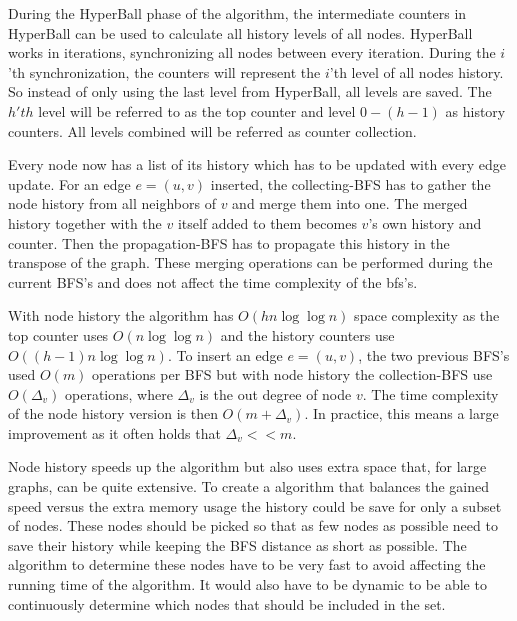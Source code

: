 During the HyperBall phase of the algorithm, the intermediate counters in HyperBall can be used to calculate all history levels of all nodes. HyperBall works in iterations, synchronizing all nodes between every iteration. During the $i$'th synchronization, the counters will represent the $i$'th level of all nodes history. So instead of only using the last level from HyperBall, all levels are saved. The $h'th$ level will be referred to as the top counter and level $0 - (h-1)$ as history counters. All levels combined will be referred as counter collection.  

Every node now has a list of its history which has to be updated with every edge update. For an edge $e = (u,v)$ inserted, the collecting-BFS has to gather the node history from all neighbors of $v$ and merge them into one. The merged history together with the $v$ itself added to them becomes $v$'s own history and counter. Then the propagation-BFS has to propagate this history in the transpose of the graph. These merging operations can be performed during the current BFS's and does not affect the time complexity of the bfs's.

With node history the algorithm has $O(hn \log \log n)$ space complexity as the top counter uses $O(n \log \log n)$ and the history counters use $O((h-1)n \log \log n)$. To insert an edge $e = (u,v)$, the two previous BFS's used $O(m)$ operations per BFS but with node history the collection-BFS use $O(\Delta_v)$ operations, where $\Delta_v$ is the out degree of node $v$. The time complexity of the node history version is then $O(m + \Delta_v)$. In practice, this means a large improvement as it often holds that $\Delta_v << m$.

Node history speeds up the algorithm but also uses extra space that, for large graphs, can be quite extensive. To create a algorithm that balances the gained speed versus the extra memory usage the history could be save for only a subset of nodes. These nodes should be picked so that as few nodes as possible need to save their history while keeping the BFS distance as short as possible. The algorithm to determine these nodes have to be very fast to avoid affecting the running time of the algorithm. It would also have to be dynamic to be able to continuously determine which nodes that should be included in the set.

